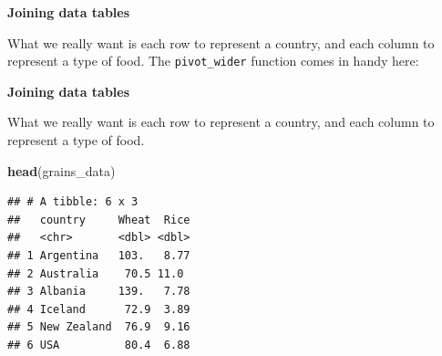 \documentclass[ignorenonframetext,]{beamer}
\newenvironment{Shaded}{\begin{snugshade}}{\end{snugshade}}
\newcommand{\CommentTok}[1]{\textcolor[rgb]{0.56,0.35,0.01}{\textit{#1}}}
\newcommand{\DataTypeTok}[1]{\textcolor[rgb]{0.13,0.29,0.53}{#1}}
\newcommand{\KeywordTok}[1]{\textcolor[rgb]{0.13,0.29,0.53}{\textbf{#1}}}
\newcommand{\NormalTok}[1]{#1}
\newcommand{\OperatorTok}[1]{\textcolor[rgb]{0.81,0.36,0.00}{\textbf{#1}}}
\newcommand{\StringTok}[1]{\textcolor[rgb]{0.31,0.60,0.02}{#1}}
\begin{document}
\begin{frame}[fragile]{}
\protect\hypertarget{section-19}{}

\textbf{\large Joining data tables}

What we really want is each row to represent a country, and each column
to represent a type of food. The \texttt{pivot\_wider} function comes in
handy here:

\vspace{1ex}\scriptsize

\begin{Shaded}
\end{Shaded}

\end{frame}

\begin{frame}[fragile]{}
\protect\hypertarget{section-20}{}

\textbf{\large Joining data tables}

What we really want is each row to represent a country, and each column
to represent a type of food.

\vspace{1ex}\scriptsize

\begin{Shaded}
\begin{Highlighting}[]
\KeywordTok{head}\NormalTok{(grains_data)}
\end{Highlighting}
\end{Shaded}

\begin{verbatim}
## # A tibble: 6 x 3
##   country     Wheat  Rice
##   <chr>       <dbl> <dbl>
## 1 Argentina   103.   8.77
## 2 Australia    70.5 11.0 
## 3 Albania     139.   7.78
## 4 Iceland      72.9  3.89
## 5 New Zealand  76.9  9.16
## 6 USA          80.4  6.88
\end{verbatim}

\end{frame}
\end{document}
